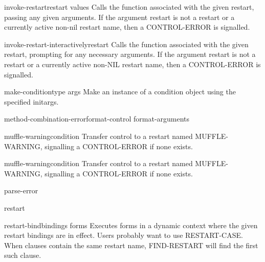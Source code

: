\begin{function}{invoke-restart}{restart \rest values}{}
  Calls the function associated with the given restart, passing any given
   arguments. If the argument restart is not a restart or a currently active
   non-nil restart name, then a CONTROL-ERROR is signalled.
\end{function}

\begin{function}{invoke-restart-interactively}{restart}{}
  Calls the function associated with the given restart, prompting for any
   necessary arguments. If the argument restart is not a restart or a
   currently active non-NIL restart name, then a CONTROL-ERROR is signalled.
\end{function}

\begin{function}{make-condition}{type \rest args}{}
  Make an instance of a condition object using the specified initargs.
\end{function}

\begin{function}{method-combination-error}{format-control \rest format-arguments}{}
  
\end{function}

\begin{function}{muffle-warning}{\op condition}{}
  Transfer control to a restart named MUFFLE-WARNING, signalling a
   CONTROL-ERROR if none exists.
\end{function}

\begin{restart}{muffle-warning}{\op condition}{}
  Transfer control to a restart named MUFFLE-WARNING, signalling a
   CONTROL-ERROR if none exists.
\end{restart}

\begin{condition-type}{parse-error}{}{}
  
\end{condition-type}

\begin{class}{restart}{}{}
  
\end{class}

\begin{macro}{restart-bind}{bindings \body forms}{}
  Executes forms in a dynamic context where the given restart bindings are
   in effect. Users probably want to use RESTART-CASE. When clauses contain
   the same restart name, FIND-RESTART will find the first such clause.
\end{macro}

